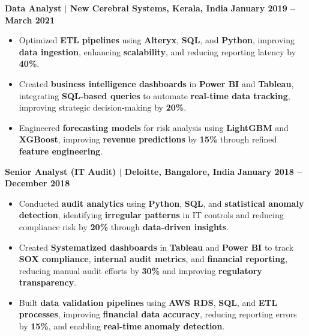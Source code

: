 \documentclass{article}
\begin{document}
\vspace{1mm}
\noindent \textbf{Data Analyst $\mid$ New Cerebral Systems, Kerala, India} \hfill \textbf{January 2019 -- March 2021}
\begin{itemize}[noitemsep, nolistsep, leftmargin=*]
    \item Optimized \textbf{ETL pipelines} using \textbf{Alteryx}, \textbf{SQL}, and \textbf{Python}, improving \textbf{data ingestion}, enhancing \textbf{scalability}, and reducing reporting latency by \textbf{40\%}.
    \item Created \textbf{business intelligence dashboards} in \textbf{Power BI} and \textbf{Tableau}, integrating \textbf{SQL-based queries} to automate \textbf{real-time data tracking}, improving strategic decision-making by \textbf{20\%}.
    \item Engineered \textbf{forecasting models} for risk analysis using \textbf{LightGBM} and \textbf{XGBoost}, improving \textbf{revenue predictions} by \textbf{15\%} through refined \textbf{feature engineering}.
\end{itemize}

\vspace{1mm}
\noindent \textbf{Senior Analyst (IT Audit) $\mid$ Deloitte, Bangalore, India} \hfill \textbf{January 2018 -- December 2018}
\begin{itemize}[noitemsep, nolistsep, leftmargin=*]
    \item Conducted \textbf{audit analytics} using \textbf{Python}, \textbf{SQL}, and \textbf{statistical anomaly detection}, identifying \textbf{irregular patterns} in IT controls and reducing compliance risk by \textbf{20\%} through \textbf{data-driven insights}.
    \item Created \textbf{Systematized dashboards} in \textbf{Tableau} and \textbf{Power BI} to track \textbf{SOX compliance}, \textbf{internal audit metrics}, and \textbf{financial reporting}, reducing manual audit efforts by \textbf{30\%} and improving \textbf{regulatory transparency}.
    \item Built \textbf{data validation pipelines} using \textbf{AWS RDS}, \textbf{SQL}, and \textbf{ETL processes}, improving \textbf{financial data accuracy}, reducing reporting errors by \textbf{15\%}, and enabling \textbf{real-time anomaly detection}.
\end{itemize}





\vspace{3mm}
\end{document}
